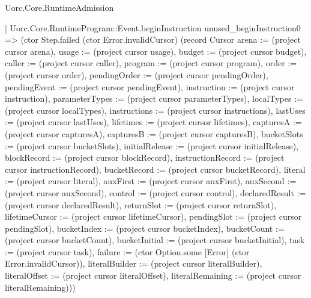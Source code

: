\begin{lexlean}{Uorc.Core.RuntimeAdmission}
\begin{semanticmodule}
{          | Uorc.Core.RuntimeProgram::Event.beginInstruction unused_beginInstruction0 => (ctor Step.failed (ctor Error.invalidCursor) (record Cursor {arena := (project cursor arena), usage := (project cursor usage), budget := (project cursor budget), caller := (project cursor caller), program := (project cursor program), order := (project cursor order), pendingOrder := (project cursor pendingOrder), pendingEvent := (project cursor pendingEvent), instruction := (project cursor instruction), parameterTypes := (project cursor parameterTypes), localTypes := (project cursor localTypes), instructions := (project cursor instructions), lastUses := (project cursor lastUses), lifetimes := (project cursor lifetimes), capturesA := (project cursor capturesA), capturesB := (project cursor capturesB), bucketSlots := (project cursor bucketSlots), initialRelease := (project cursor initialRelease), blockRecord := (project cursor blockRecord), instructionRecord := (project cursor instructionRecord), bucketRecord := (project cursor bucketRecord), literal := (project cursor literal), auxFirst := (project cursor auxFirst), auxSecond := (project cursor auxSecond), control := (project cursor control), declaredResult := (project cursor declaredResult), returnSlot := (project cursor returnSlot), lifetimeCursor := (project cursor lifetimeCursor), pendingSlot := (project cursor pendingSlot), bucketIndex := (project cursor bucketIndex), bucketCount := (project cursor bucketCount), bucketInitial := (project cursor bucketInitial), task := (project cursor task), failure := (ctor Option.some [Error] (ctor Error.invalidCursor)), literalBuilder := (project cursor literalBuilder), literalOffset := (project cursor literalOffset), literalRemaining := (project cursor literalRemaining)}))
}
\end{semanticmodule}
\end{lexlean}
